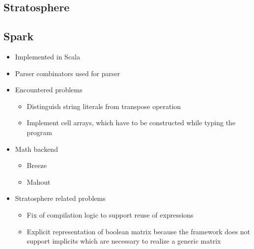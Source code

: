 \subsection{Stratosphere}

\subsection{Spark}

\begin{itemize}
	\item Implemented in Scala
	\item Parser combinators used for parser
	\item Encountered problems
	\begin{itemize}
		\item Distinguish string literals from transpose operation
		\item Implement cell arrays, which have to be constructed while typing the program
	\end{itemize}
	\item Math backend
	\begin{itemize}
		\item Breeze
		\item Mahout
	\end{itemize}
	\item Stratosphere related problems
	\begin{itemize}
		\item Fix of compilation logic to support reuse of expressions
		\item Explicit representation of boolean matrix because the framework does not support implicits which are necessary to realize a generic matrix
	\end{itemize}
\end{itemize}

